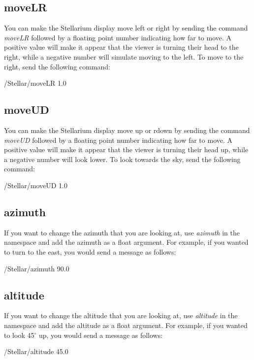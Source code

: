 \subsection{moveLR}
You can make the Stellarium display move left or right by sending the command \textit{moveLR} followed by a floating point number indicating how far to move. A positive value will make it appear that the viewer is turning their head to the right, while a negative number will simulate moving to the left. To move to the right, send the following command:
  \begin{syntax}	
 	\medskip
 	/Stellar/moveLR 1.0
 	\medskip
 \end{syntax}
 \bigskip

\subsection{moveUD}
You can make the Stellarium display move up or rdown by sending the command \textit{moveUD} followed by a floating point number indicating how far to move. A positive value will make it appear that the viewer is turning their head up, while a negative number will look lower. To look towards the sky, send the following command:
\begin{syntax}	
	\medskip
	/Stellar/moveUD 1.0
	\medskip
\end{syntax}
\bigskip

\subsection{azimuth}
If you want to change the azimuth that you are looking at, use \textit{azimuth} in the namespace and add the azimuth as a float argument. For example, if you wanted to turn to the east, you would send a message as follows:
 \begin{syntax}	
	\medskip
	/Stellar/azimuth 90.0
	\medskip
\end{syntax}

\subsection{altitude}
If you want to change the altitude that you are looking at, use \textit{altitude} in the namespace and add the altitude as a float argument. For example, if you wanted to look 45$^{\circ}$ up, you would send a message as follows:
\begin{syntax}	
	\medskip
	/Stellar/altitude 45.0
	\medskip
\end{syntax}

